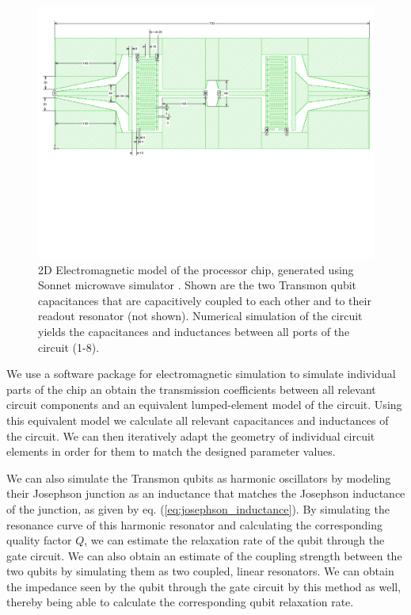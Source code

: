 \begin{figure}[ht!]
	\centering
	\includegraphics[width=\textwidth]{./material/figures/2-qubit-processor/sonnet_simulation_of_qubit_chip}
	\caption[]{2D Electromagnetic model of the processor chip, generated using Sonnet microwave simulator \citep{}. Shown are the two Transmon qubit capacitances that are capacitively coupled to each other and to their readout resonator (not shown). Numerical simulation of the circuit yields the capacitances and inductances between all ports of the circuit (1-8).}
	\label{fig:sonnet_model_of_qubit_chip}
\end{figure}

We use a software package for electromagnetic simulation \citep{} to simulate individual parts of the chip an obtain the transmission coefficients between all relevant circuit components and an equivalent lumped-element model of the circuit. Using this equivalent model we calculate all relevant capacitances and inductances of the circuit. We can then iteratively adapt the geometry of individual circuit elements in order for them to match the designed parameter values.

\smallskip

We can also simulate the Transmon qubits as harmonic oscillators by modeling their Josephson junction as an inductance that matches the Josephson inductance of the junction, as given by eq. (\ref{eq:josephson_inductance}). By simulating the resonance curve of this harmonic resonator and calculating the corresponding quality factor $Q$, we can estimate the relaxation rate of the qubit through the gate circuit. We can also obtain an estimate of the coupling strength between the two qubits by simulating them as two coupled, linear resonators. We can obtain the impedance seen by the qubit through the gate circuit by this method as well, thereby being able to calculate the corresponding qubit relaxation rate.

